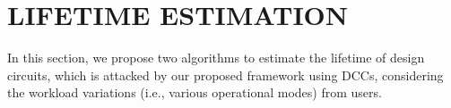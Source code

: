 \section{LIFETIME ESTIMATION}
\label{sec:lt_estimation}
\begin{comment}
\begin{figure*}[!ht]
    \centering
    \subfigure{
    	\label{fig:sub:alg1}
        \texttt{[image: algorithm1.png]}
    }
    \hspace{1.6cm}
    \subfigure{
    	\label{fig:sub:alg2}
        \texttt{[image: algorithm2.png]}
    }
    \caption{Algorithms used to estimate lifetime of designs}
    \label{fig:en}
\end{figure*}
\end{comment}
In this section, we propose two algorithms to estimate the lifetime of design circuits, which is attacked by our proposed framework using DCCs, considering the workload variations (i.e., various operational modes) from users. %


